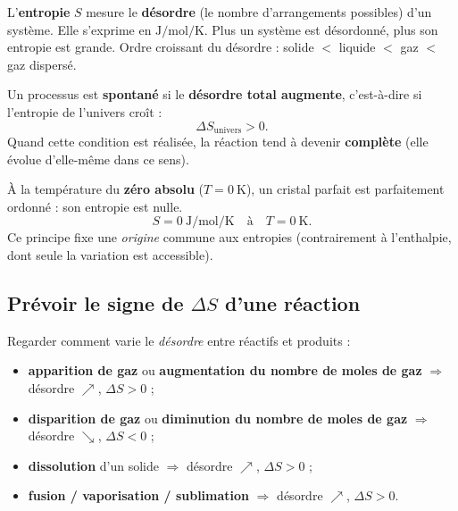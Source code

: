 \documentclass[11pt,a4paper]{article}
\newcommand{\dS}{\Delta S}
\begin{document}
\begin{definition}
L'\textbf{entropie} $S$ mesure le \textbf{désordre} (le nombre d'arrangements possibles) d'un système.
Elle s'exprime en $\si{\joule\per\mol\per\kelvin}$. Plus un système est désordonné, plus son entropie
est grande. Ordre croissant du désordre : \;solide $<$ liquide $<$ gaz $<$ gaz dispersé.
\end{definition}

\begin{principe}
Un processus est \textbf{spontané} si le \textbf{désordre total augmente}, c'est-à-dire si l'entropie de
l'univers croît :
\[ \dS_{\text{univers}} > 0. \]
Quand cette condition est réalisée, la réaction tend à devenir \textbf{complète} (elle évolue d'elle-même
dans ce sens).
\end{principe}

\begin{principe}
À la température du \textbf{zéro absolu} ($T = \SI{0}{\kelvin}$), un cristal parfait est parfaitement
ordonné : son entropie est nulle.
\[ S = \SI{0}{\joule\per\mol\per\kelvin}\quad\text{à}\quad T = \SI{0}{\kelvin}. \]
Ce principe fixe une \emph{origine} commune aux entropies (contrairement à l'enthalpie, dont seule la
variation est accessible).
\end{principe}

\subsection{Prévoir le signe de $\dS$ d'une réaction}

\begin{methode}
Regarder comment varie le \emph{désordre} entre réactifs et produits :
\begin{itemize}[leftmargin=1.6em,topsep=2pt,itemsep=1.5pt]
  \item \textbf{apparition de gaz} ou \textbf{augmentation du nombre de moles de gaz} $\Rightarrow$ désordre $\nearrow$, $\dS > 0$ ;
  \item \textbf{disparition de gaz} ou \textbf{diminution du nombre de moles de gaz} $\Rightarrow$ désordre $\searrow$, $\dS < 0$ ;
  \item \textbf{dissolution} d'un solide $\Rightarrow$ désordre $\nearrow$, $\dS > 0$ ;
  \item \textbf{fusion / vaporisation / sublimation} $\Rightarrow$ désordre $\nearrow$, $\dS > 0$.
\end{itemize}
\end{methode}
\end{document}
